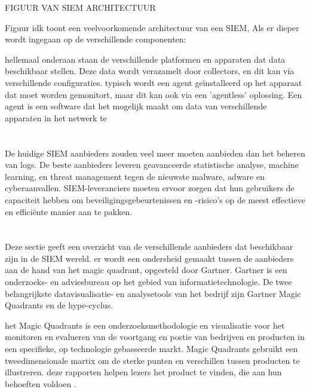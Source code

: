 FIGUUR VAN SIEM ARCHITECTUUR

Figuur idk toont een veelvoorkomende architectuur van een SIEM, Als er dieper wordt ingegaan op de verschillende componenten: 

hellemaal onderaan staan de verschillende platformen en apparaten dat data beschikbaar stellen. Deze data wordt verazamelt door collectors, en dit kan via verschillende configuraties. typisch wordt een agent geïnstalleerd op het apparaat dat moet worden gemonitort, maar dit kan ook via een 'agentless' oplossing.
Een agent is een software dat het mogelijk maakt om data van verschillende apparaten in het netwerk te 




\section{}

De huidige SIEM aanbieders zouden veel meer moeten aanbieden dan het beheren van logs. De beste aanbieders leveren geavanceerde statistische analyse, machine learning, en threat management tegen de nieuwste malware, adware en cyberaanvallen. SIEM-leveranciers moeten ervoor zorgen dat hun gebruikers de capaciteit hebben om beveiligingsgebeurtenissen en -risico's op de meest effectieve en efficiënte manier aan te pakken.  

\section{}

Deze sectie geeft een overzicht van de verschillende aanbieders dat beschikbaar zijn in de SIEM wereld. er wordt een ondersheid gemaakt tussen de aanbieders aan de hand van het magic quadrant, opgesteld door Gartner. Gartner is een onderzoeks- en adviesbureau op het gebied van informatietechnologie. De twee belangrijkste datavisualisatie- en analysetools van het bedrijf zijn Gartner Magic Quadrants en de hype-cyclus.

het Magic Quadrants is een onderzoeksmethodologie en visualisatie voor het monitoren en evalueren van de voortgang en postie van bedrijven en producten in een specifieke, op technologie gebasseerde markt. Magic Quadrants gebruikt een tweedimensionale martix om de sterke punten en verschillen tussen producten te illustreren. deze rapporten helpen lezers het product te vinden, die aan hun behoeften voldoen \autocite{Miller2019}.

